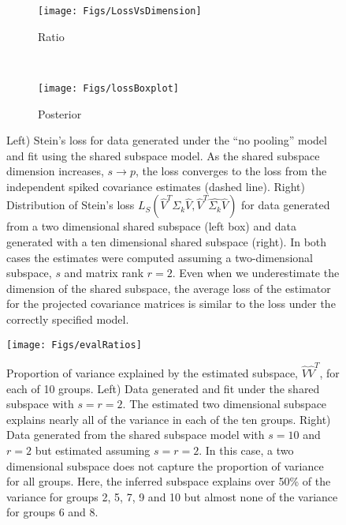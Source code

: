\documentclass{article}
\begin{document}
\begin{figure}[t]
    \centering
    \begin{subfigure}[b]{0.45\textwidth}
        \texttt{[image: Figs/LossVsDimension]}
        \caption{Ratio}
        \label{fig:sdimension}
    \end{subfigure}
    ~ %
    \begin{subfigure}[b]{0.45\textwidth}
        \texttt{[image: Figs/lossBoxplot]}
        \caption{Posterior}
        \label{fig:lossBoxplot}
    \end{subfigure}
    \caption{Left) Stein's loss for data generated under the ``no
      pooling'' model and fit using the shared subspace model.  As the
      shared subspace dimension increases, $s \rightarrow p$, the loss
      converges to the loss from the independent spiked covariance
      estimates (dashed line). Right) Distribution of Stein's loss
      $L_S(\hat{V}^T\Sigma_k\hat{V}, \hat{V}^T\hat{\Sigma_k}\hat{V})$
      for data generated from a two dimensional shared subspace (left
      box) and data generated with a ten dimensional shared subspace
      (right).  In both cases the estimates were computed assuming a
      two-dimensional subspace, $s$ and matrix rank $r=2$.  Even when
      we underestimate the dimension of the shared subspace, the
      average loss of the estimator for the projected covariance matrices is
      similar to the loss under the correctly specified model. }
\end{figure}



\begin{figure}[!ht]
  \centering
    \texttt{[image: Figs/evalRatios]}
    \caption{Proportion of variance explained by the estimated
      subspace, $\hat{V}\hat{V}^T$, for each of 10 groups.  Left) Data
      generated and fit under the shared subspace with $s=r=2$.  The
      estimated two dimensional subspace explains nearly all of the
      variance in each of the ten groups.  Right) Data generated from
      the shared subspace model with $s=10$ and $r=2$ but estimated
      assuming $s=r=2$.  In this case, a two dimensional subspace does
      not capture the proportion of variance for all groups.  Here,
      the inferred subspace explains over 50\% of the variance for
      groups 2, 5, 7, 9 and 10 but almost none of the variance for
      groups 6 and 8. }
\label{fig:evalRatios}
\end{figure}
\end{document}
